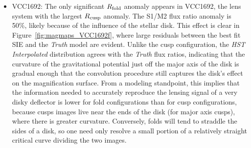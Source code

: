 \begin{itemize}
	
	\item VCC1692: The only significant $R_{\rm{fold}}$ anomaly appears in VCC1692, the lens system with the largest $R_{\rm{cusp}}$ anomaly. The S1/M2 flux ratio anomaly is 50\%, likely because of the influence of the stellar disk. This effect is clear in Figure~\ref{fig:magmaps_VCC1692f}, where large residuals between the best fit SIE and the \textit{Truth} model are evident. Unlike the cusp configuration, the \textit{HST Interpolated} distribution agrees with the \textit{Truth} flux ratios, indicating that the curvature of the gravitational potential just off the major axis of the disk is gradual enough that the convolution procedure still captures the disk's effect on the magnification surface. From a modeling standpoint, this implies that the information needed to accurately reproduce the lensing signal of a very disky deflector is lower for fold configurations than for cusp configurations, because cusps images live near the ends of the disk (for major axis cusps), where there is greater curvature. Conversely, folds will tend to straddle the sides of a disk, so one need only resolve a small portion of a relatively straight critical curve dividing the two images.
	

\end{itemize}
